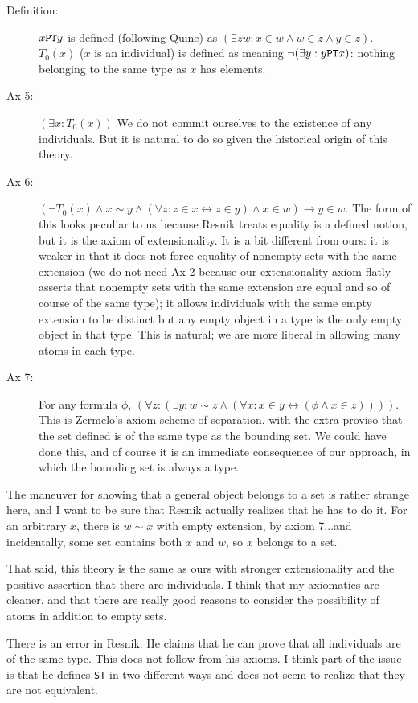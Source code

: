\documentclass[12pt]{article}
\begin{document}
\begin{description}
\item[Definition:]  $x {\tt PT} y$ is defined (following Quine) as $(\exists zw:x \in w \wedge w \in z \wedge y \in z)$.  $T_0(x)$ ($x$ is an individual)
is defined as meaning $\neg(\exists y:y {\tt PT} x)$:  nothing belonging to the same type as $x$ has elements.

\item[Ax 5:]  $(\exists x:T_0(x))$  We do not commit ourselves to the existence of any individuals.  But it is natural to do so given the historical origin of this theory.

\item[Ax 6:]  $(\neg T_0(x) \wedge x \sim y \wedge (\forall z:z \in x \leftrightarrow z \in y) \wedge x \in w) \rightarrow y \in w$.  The form of this looks peculiar to us because Resnik treats equality is a defined notion, but it is the axiom of extensionality.  It is a bit different from ours:  it is weaker in that it does not force equality of nonempty sets with the same extension (we do not need Ax 2 because our extensionality axiom flatly asserts that nonempty sets with the same extension are equal and so of course of the same type);  it allows individuals with the same empty extension to be distinct but any empty object in a type is the only empty object in that type.  This is natural;  we are more liberal in allowing many atoms in each type.

\item[Ax 7:] For any formula $\phi$, $(\forall z:(\exists y:w \sim z \wedge (\forall x:x \in y \leftrightarrow (\phi \wedge x \in z))))$.  This is Zermelo's axiom scheme of separation, with the extra proviso that the set defined is of the same type as the bounding set.  We could have done this, and of course it is an immediate consequence of our approach, in which the bounding set is always a type.

\end{description}

The maneuver for showing that a general object belongs to a set is rather strange here, and I want to be sure that Resnik actually realizes that he has to do it.
For an arbitrary $x$, there is $w \sim x$ with empty extension, by axiom 7...and incidentally, some set contains both $x$ and $w$, so $x$ belongs to a set.

That said, this theory is the same as ours with stronger extensionality and the positive assertion that there are individuals.  I think that my axiomatics are cleaner, and that there are really good reasons to consider the possibility of atoms in addition to empty sets.

There is an error in Resnik.  He claims that he can prove that all individuals are of the same type.  This does not follow from his axioms.  I think part of the issue is that he defines {\tt ST} in two different ways and does not seem to realize that they are not equivalent.
\end{document}
